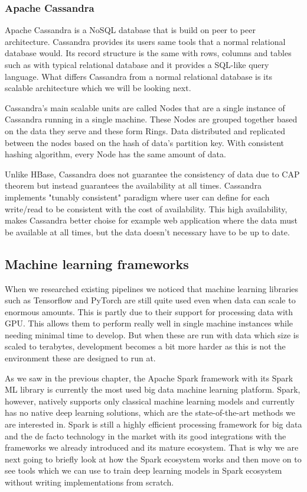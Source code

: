 \subsubsection{Apache Cassandra}

Apache Cassandra is a NoSQL database that is build on peer to peer architecture.
Cassandra provides its users same tools that a normal relational database would.
Its record structure is the same with rows, columns and tables such as with typical relational database and it provides a SQL-like query language.
What differs Cassandra from a normal relational database is its scalable architecture which we will be looking next. \cite{yarabarla}

Cassandra's main scalable units are called Nodes that are a single instance of Cassandra running in a single machine.
These Nodes are grouped together based on the data they serve and these form Rings.
Data distributed and replicated between the nodes based on the hash of data's partition key.
With consistent hashing algorithm, every Node has the same amount of data. \cite{neeraj}

Unlike HBase, Cassandra does not guarantee the consistency of data due to CAP theorem but instead guarantees the availability at all times.
Cassandra implements "tunably consistent" paradigm where user can define for each write/read to be consistent with the cost of availability.
This high availability, makes Cassandra better choise for example web application where the data must be available at all times, but the data doesn't necessary have to be up to date. \cite{neeraj}

\subsection{Machine learning frameworks}

When we researched existing pipelines we noticed that machine learning libraries such as Tensorflow and PyTorch are still quite used even when data can scale to enormous amounts.
This is partly due to their support for processing data with GPU.
This allows them to perform really well in single machine instances while needing minimal time to develop.
But when these are run with data which size is scaled to terabytes, development becomes a bit more harder as this is not the environment these are designed to run at.

As we saw in the previous chapter, the Apache Spark framework with its Spark ML library is currently the most used big data machine learning platform.
Spark, however, natively supports only classical machine learning models and currently has no native deep learning solutions, which are the state-of-the-art methods we are interested in.
Spark is still a highly efficient processing framework for big data and the de facto technology in the market with its good integrations with the frameworks we already introduced and its mature ecosystem.
That is why we are next going to briefly look at how the Spark ecosystem works and then move on to see tools which we can use to train deep learning models in Spark ecosystem without writing implementations from scratch.

